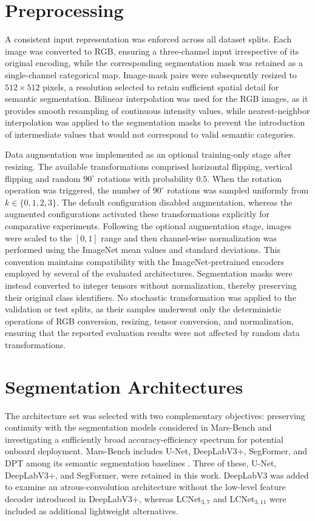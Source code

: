 \section{Preprocessing}

A consistent input representation was enforced across all dataset splits. Each image was converted to RGB, ensuring a three-channel input irrespective of its original encoding, while the corresponding segmentation mask was retained as a single-channel categorical map. Image-mask pairs were subsequently resized to \(512 \times 512\) pixels, a resolution selected to retain sufficient spatial detail for semantic segmentation. Bilinear interpolation was used for the RGB images, as it provides smooth resampling of continuous intensity values, while nearest-neighbor interpolation was applied to the segmentation masks to prevent the introduction of intermediate values that would not correspond to valid semantic categories.

Data augmentation was implemented as an optional training-only stage after resizing. The available transformations comprised horizontal flipping, vertical flipping and random \(90^{\circ}\) rotations with probability \(0.5\). When the rotation operation was triggered, the number of \(90^{\circ}\) rotations was sampled uniformly from \(k \in \{0,1,2,3\}\). The default configuration disabled augmentation, whereas the augmented configurations activated these transformations explicitly for comparative experiments. Following the optional augmentation stage, images were scaled to the \([0,1]\) range and then channel-wise normalization was performed using the ImageNet mean values and standard deviations. This convention maintains compatibility with the ImageNet-pretrained encoders employed by several of the evaluated architectures. Segmentation masks were instead converted to integer tensors without normalization, thereby preserving their original class identifiers.
No stochastic transformation was applied to the validation or test splits, as their samples underwent only the deterministic operations of RGB conversion, resizing, tensor conversion, and normalization, ensuring that the reported evaluation results were not affected by random data transformations.

\section{Segmentation Architectures}
\label{sec:segmentation-architectures}

The architecture set was selected with two complementary objectives: preserving continuity with the segmentation models considered in Mars-Bench and investigating a sufficiently broad accuracy-efficiency spectrum for potential onboard deployment. Mars-Bench includes U-Net, DeepLabV3+, SegFormer, and DPT among its semantic segmentation baselines \cite{purohit2025marsbench}. Three of these, U-Net, DeepLabV3+, and SegFormer, were retained in this work. DeepLabV3 was added to examine an atrous-convolution architecture without the low-level feature decoder introduced in DeepLabV3+, whereas LCNet\(_{3,7}\) and LCNet\(_{3,11}\) were included as additional lightweight alternatives.

